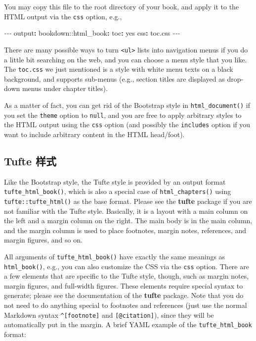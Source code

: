 \documentclass[
  12pt,
]{krantz}
\newenvironment{Shaded}{\begin{snugshade}}{\end{snugshade}}
\newcommand{\AttributeTok}[1]{\textcolor[rgb]{0.77,0.63,0.00}{#1}}
\newcommand{\CharTok}[1]{\textcolor[rgb]{0.31,0.60,0.02}{#1}}
\newcommand{\FunctionTok}[1]{\textcolor[rgb]{0.00,0.00,0.00}{#1}}
\newcommand{\KeywordTok}[1]{\textcolor[rgb]{0.13,0.29,0.53}{\textbf{#1}}}
\newcommand{\PreprocessorTok}[1]{\textcolor[rgb]{0.56,0.35,0.01}{\textit{#1}}}
\theoremstyle{definition}
\theoremstyle{definition}
\theoremstyle{definition}
\theoremstyle{definition}
\theoremstyle{remark}
\begin{document}
You may copy this file to the root directory of your book, and apply it to the HTML output via the \texttt{css} option, e.g.,

\begin{Shaded}
\begin{Highlighting}[]
\PreprocessorTok{{-}{-}{-}}
\FunctionTok{output}\KeywordTok{:}
\AttributeTok{  bookdown:}\FunctionTok{:html\_book}\KeywordTok{:}
\AttributeTok{    }\FunctionTok{toc}\KeywordTok{:}\AttributeTok{ }\CharTok{yes}
\AttributeTok{    }\FunctionTok{css}\KeywordTok{:}\AttributeTok{ toc.css}
\PreprocessorTok{{-}{-}{-}}
\end{Highlighting}
\end{Shaded}

There are many possible ways to turn \texttt{\textless{}ul\textgreater{}} lists into navigation menus if you do a little bit searching on the web, and you can choose a menu style that you like. The \texttt{toc.css} we just mentioned is a style with white menu texts on a black background, and supports sub-menus (e.g., section titles are displayed as drop-down menus under chapter titles).

As a matter of fact, you can get rid of the Bootstrap style in \texttt{html\_document()} if you set the \texttt{theme} option to \texttt{null}, and you are free to apply arbitrary styles to the HTML output using the \texttt{css} option (and possibly the \texttt{includes} option if you want to include arbitrary content in the HTML head/foot).

\hypertarget{tufte-ux6837ux5f0f}{%
\subsection{Tufte 样式}\label{tufte-ux6837ux5f0f}}

Like the Bootstrap style, the Tufte style is provided by an output format \texttt{tufte\_html\_book()}, which is also a special case of \texttt{html\_chapters()} using \texttt{tufte::tufte\_html()} as the base format. Please see the \textbf{tufte} package \citep{R-tufte} if you are not familiar with the Tufte style. Basically, it is a layout with a main column on the left and a margin column on the right. The main body is in the main column, and the margin column is used to place footnotes, margin notes, references, and margin figures, and so on.

All arguments of \texttt{tufte\_html\_book()} have exactly the same meanings as \texttt{html\_book()}, e.g., you can also customize the CSS via the \texttt{css} option. There are a few elements that are specific to the Tufte style, though, such as margin notes, margin figures, and full-width figures. These elements require special syntax to generate; please see the documentation of the \textbf{tufte} package. Note that you do not need to do anything special to footnotes and references (just use the normal Markdown syntax \texttt{\^{}{[}footnote{]}} and \texttt{{[}@citation{]}}), since they will be automatically put in the margin. A brief YAML example of the \texttt{tufte\_html\_book} format:
\end{document}
